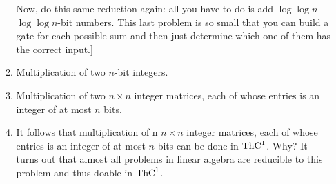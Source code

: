 \documentclass[12pt]{article}
\begin{document}
\begin{enumerate}
\begin{enumerate}
Now, do this same reduction again: all you have to do is add $\log \log n$
$\log \log n$-bit numbers.  This last problem is so small that you can
build a gate for each possible sum and then just determine which one of
them has the correct input.]
\item Multiplication of two $n$-bit integers.
\item Multiplication of two $n\times n$ integer matrices, each of whose
entries is an integer of at most $n$ bits.
\item It follows that multiplication of n $n\times n$ integer matrices, each of whose
entries is an integer of at most $n$ bits can be done in  $\mbox{{\rm ThC}}^1$.  Why?
It turns out that almost all problems in linear algebra are reducible to
this problem and thus doable in $\mbox{{\rm ThC}}^1$.
\end{enumerate}


\end{enumerate}
\end{document}
